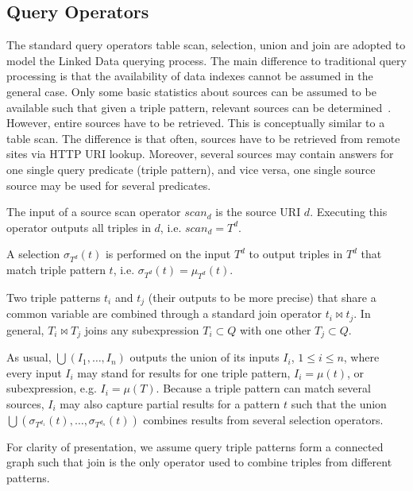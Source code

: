 \subsection{Query Operators}
\label{sec:ops}
The standard query operators table scan, selection, union and join are adopted to model the Linked Data querying process. The main difference to traditional query processing is that the availability of data indexes cannot be assumed in the general case. Only some basic statistics about sources can be assumed to be available such that given a triple pattern, relevant sources can be determined~\cite{harth_data_2010,ladwig_linked_2010}. However, entire sources have to be retrieved. This is conceptually similar to a table scan. The difference is that often, sources have to be retrieved from remote sites via HTTP URI lookup. Moreover, several sources may contain answers for one single query predicate (triple pattern), and vice versa, one single source source may be used for several predicates.  
\begin{definition} The input of a source scan operator $scan_d$ is the source URI $d$.
Executing this operator outputs all triples in $d$, i.e. $scan_d = T^d$.
\end{definition}
\begin{definition}[Selection]  A selection $\sigma_{T^d}(t)$ is performed on the input $T^d$ to output
triples in $T^d$ that match triple pattern $t$, i.e. $\sigma_{T^d}(t) = \mu_{T^d}(t)$. 
\end{definition}
Two triple patterns $t_i$ and $t_j$ (their outputs to be more precise) that share a common variable are combined through a standard join operator $t_i\Join t_j$. In general, $T_i\Join T_j$ joins any subexpression $T_i \subset Q$ with one other $T_j \subset Q$. 
\begin{definition}[Union] As usual, $\bigcup(I_1,\ldots,I_n)$
outputs the union of its inputs $I_i$, $1\leq i \leq n$, where every input $I_i$ may stand for results for one triple pattern, $I_i = \mu(t)$, or subexpression, e.g. $I_i = \mu(T)$. Because a triple pattern can match several sources, $I_i$ may also capture partial results for a pattern $t$ such that the union
$\bigcup(\sigma_{T^{d_1}}(t),\ldots,\sigma_{T^{d_n}}(t))$ combines results from several selection operators.   
\end{definition}
For clarity of presentation, we assume query triple patterns form a connected graph such that join is the only operator used to combine triples from different patterns. 


